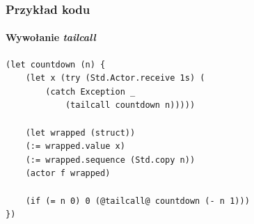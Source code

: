 \documentclass[aspectratio=169]{beamer}
\begin{document}
\begin{frame}[fragile]
    \frametitle{Przykład kodu}
    \framesubtitle{Wywołanie \emph{tailcall}}

    \begin{small}
    \begin{lstlisting}
(let countdown (n) {
    (let x (try (Std.Actor.receive 1s) (
        (catch Exception _
            (tailcall countdown n)))))

    (let wrapped (struct))
    (:= wrapped.value x)
    (:= wrapped.sequence (Std.copy n))
    (actor f wrapped)

    (if (= n 0) 0 (@tailcall@ countdown (- n 1)))
})
    \end{lstlisting}
    \end{small}
\end{frame}


\end{document}
